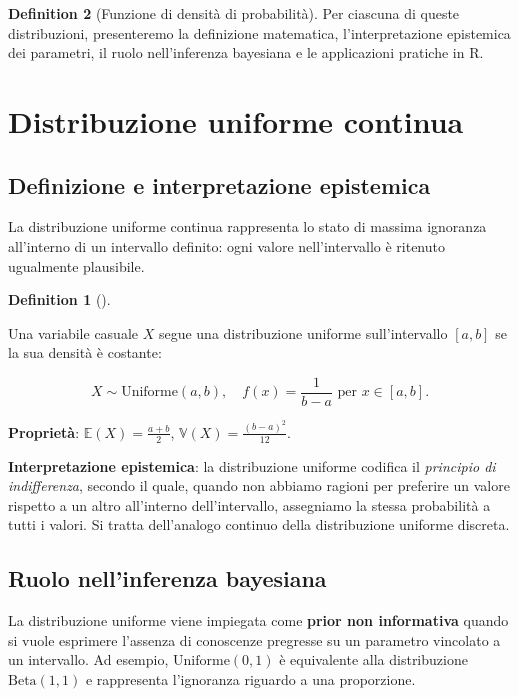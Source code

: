 \documentclass[
  letterpaper,
  DIV=11,
  numbers=noendperiod,
  oneside]{scrreprt}
\theoremstyle{definition}
\theoremstyle{plain}
\theoremstyle{definition}
\newtheorem{definition}{Definition}[chapter]
\theoremstyle{remark}
\begin{document}
\begin{definition}[Funzione di densità di
probabilità]
Per ciascuna di queste distribuzioni, presenteremo la definizione
matematica, l'interpretazione epistemica dei parametri, il ruolo
nell'inferenza bayesiana e le applicazioni pratiche in R.

\section{Distribuzione uniforme
continua}\label{distribuzione-uniforme-continua}

\subsection{Definizione e interpretazione
epistemica}\label{definizione-e-interpretazione-epistemica-5}

La distribuzione uniforme continua rappresenta lo stato di massima
ignoranza all'interno di un intervallo definito: ogni valore
nell'intervallo è ritenuto ugualmente plausibile.

\begin{definition}[]\protect\hypertarget{def-uniform-cont}{}\label{def-uniform-cont}

Una variabile casuale \(X\) segue una distribuzione uniforme
sull'intervallo \([a, b]\) se la sua densità è costante:

\[
X \sim \text{Uniforme}(a, b), \quad f(x) = \frac{1}{b-a} \text{ per } x \in [a,b].
\]

\textbf{Proprietà}: \(\mathbb{E}(X) = \frac{a+b}{2}\),
\(\mathbb{V}(X) = \frac{(b-a)^2}{12}\).

\end{definition}

\textbf{Interpretazione epistemica}: la distribuzione uniforme codifica
il \emph{principio di indifferenza}, secondo il quale, quando non
abbiamo ragioni per preferire un valore rispetto a un altro all'interno
dell'intervallo, assegniamo la stessa probabilità a tutti i valori. Si
tratta dell'analogo continuo della distribuzione uniforme discreta.

\subsection{Ruolo nell'inferenza
bayesiana}\label{ruolo-nellinferenza-bayesiana-5}

La distribuzione uniforme viene impiegata come \textbf{prior non
informativa} quando si vuole esprimere l'assenza di conoscenze pregresse
su un parametro vincolato a un intervallo. Ad esempio,
\(\text{Uniforme}(0, 1)\) è equivalente alla distribuzione
\(\text{Beta}(1, 1)\) e rappresenta l'ignoranza riguardo a una
proporzione.


\end{definition}
\end{document}
